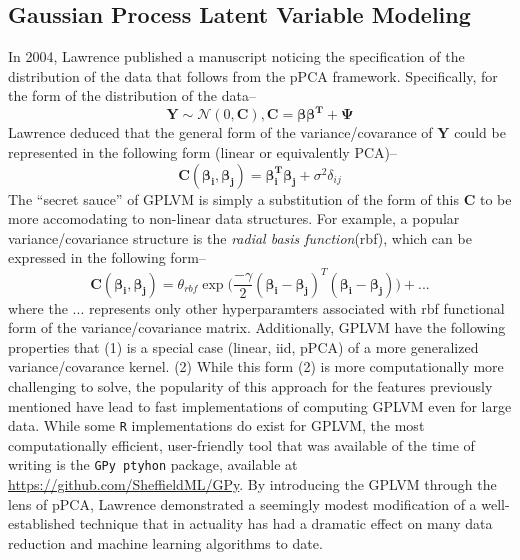 \documentclass[english, 11pt]{article}\usepackage[]{graphicx}\usepackage[]{color}
\begin{document}
\subsection{Gaussian Process Latent Variable Modeling}
In 2004, Lawrence published a manuscript \cite{lawrence2004gaussian} noticing the specification of the distribution of the data that follows from the pPCA framework. Specifically, for the form of the distribution of the data--
$$\mathbf{Y} \sim  \mathcal{N} (0, \mathbf{C}), \mathbf{C} = \mathbf{\beta\beta^T }+ \mathbf{\Psi}$$
Lawrence deduced that the general form of the variance/covarance of $\mathbf{Y}$ could be represented in the following form (linear or equivalently PCA)--
\begin{equation}
\mathbf{C}(\mathbf{\beta_i},\mathbf{\beta_j}) = \mathbf{\beta_i^T}\mathbf{\beta_j} + \sigma^2\delta_{ij}
\end{equation}
The ``secret sauce'' of GPLVM is simply a substitution of the form of this $\mathbf{C}$ to be more accomodating to non-linear data structures. For example, a popular variance/covariance structure is the \textit{radial basis function}(rbf), which can be expressed in the following form-- 
\begin{equation}
\mathbf{C}(\mathbf{\beta_i},\mathbf{\beta_j}) = \theta_{rbf} \exp \Big(\frac{-\gamma}{2}(\mathbf{\beta_i}-\mathbf{\beta_j})^{T}(\mathbf{\beta_i}-\mathbf{\beta_j})  \Big) + ...
\end{equation}
where the $...$ represents only other hyperparamters associated with rbf functional form of the variance/covariance matrix. Additionally, GPLVM have the following properties that (1) is a special case (linear, iid, pPCA) of a more generalized variance/covarance kernel. (2) While this form (2) is more computationally more challenging to solve, the popularity of this approach for the features previously mentioned have lead to fast implementations of computing GPLVM even for large data. While some \texttt{R} implementations do exist for GPLVM, the most computationally efficient, user-friendly tool that was available of the time of writing is the \texttt{GPy ptyhon} package, available at \url{https://github.com/SheffieldML/GPy}. \newline \newline
By introducing the GPLVM through the lens of pPCA, Lawrence \cite{lawrence2004gaussian} demonstrated a seemingly modest modification of a well-established technique that in actuality has had a dramatic effect on many data reduction and machine learning algorithms to date. 
\end{document}
